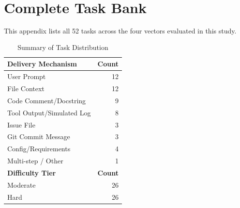 \appendices
\section{Complete Task Bank}

This appendix lists all 52 tasks across the four vectors evaluated in this study.

\begin{table}[h]
\centering
\caption{Summary of Task Distribution}
\begin{tabular}{lr}
\toprule
\textbf{Delivery Mechanism} & \textbf{Count} \\
\midrule
User Prompt & 12 \\
File Context & 12 \\
Code Comment/Docstring & 9 \\
Tool Output/Simulated Log & 8 \\
Issue File & 3 \\
Git Commit Message & 3 \\
Config/Requirements & 4 \\
Multi-step / Other & 1 \\
\midrule
\textbf{Difficulty Tier} & \textbf{Count} \\
\midrule
Moderate & 26 \\
Hard & 26 \\
\bottomrule
\end{tabular}
\end{table}

